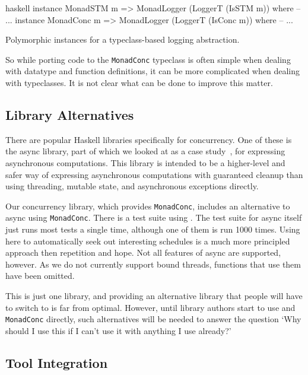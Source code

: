 \begin{listing}
\centering
\begin{cminted}{haskell}
instance MonadSTM  m => MonadLogger (LoggerT (IsSTM  m)) where -- ...
instance MonadConc m => MonadLogger (LoggerT (IsConc m)) where -- ...
\end{cminted}
\caption{Polymorphic instances for a typeclass-based logging abstraction.}\label{lst:mlogger3}
\end{listing}

So while porting code to the \verb|MonadConc| typeclass is often
simple when dealing with datatype and function definitions, it can be
more complicated when dealing with typeclasses.  It is not clear what
can be done to improve this matter.

\subsection{Library Alternatives}

There are popular Haskell libraries specifically for concurrency.  One
of these is the async library\cite{async}, part of which we looked at
as a case study~, for expressing
asynchronous computations.  This library is intended to be a
higher-level and safer way of expressing asynchronous computations
with guaranteed cleanup than using threading, mutable state, and
asynchronous exceptions directly.

Our concurrency library\cite{concurrency}, which provides
\verb|MonadConc|, includes an alternative to async using
\verb|MonadConc|.  There is a test suite using \dejafu{}.  The test
suite for async itself just runs most tests a single time, although
one of them is run 1000 times.  Using \dejafu{} here to automatically
seek out interesting schedules is a much more principled approach then
repetition and hope.  Not all features of async are supported,
however.  As we do not currently support bound threads, functions that
use them have been omitted.

This is just one library, and providing an alternative library that
people will have to switch to is far from optimal.  However, until
library authors start to use \dejafu{} and \verb|MonadConc| directly,
such alternatives will be needed to answer the question `Why should I
use this if I can't use it with anything I use already?'

\subsection{Tool Integration}

